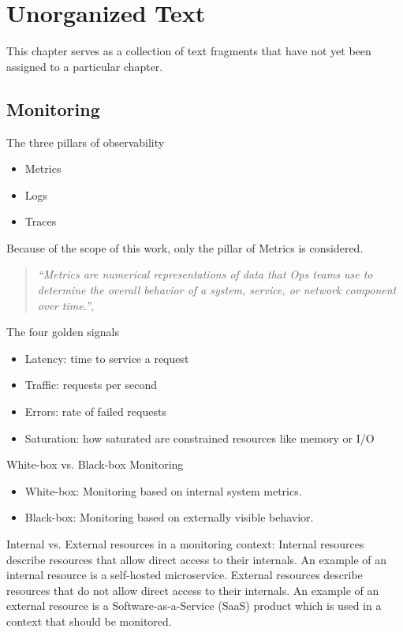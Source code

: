 \chapter{Unorganized Text}


This chapter serves as a collection of text fragments that have not yet been assigned to a particular chapter.

\section{Monitoring}

The three pillars of observability \cite{9837035}
\begin{itemize}
    \item Metrics
    \item Logs
    \item Traces
\end{itemize}

Because of the scope of this work, only the pillar of Metrics is considered.

\begin{quote}
\textit{``Metrics are numerical representations of data that Ops teams use to determine the overall behavior of a system, service, or network component over time.'', \cite{9837035}}
\end{quote}

The four golden signals \cite{Beyer2016-xi}
\begin{itemize}
    \item Latency: time to service a request
    \item Traffic: requests per second
    \item Errors: rate of failed requests
    \item Saturation: how saturated are constrained resources like memory or I/O
\end{itemize}

White-box vs. Black-box Monitoring \cite{Beyer2016-xi}
\begin{itemize}
    \item White-box: Monitoring based on internal system metrics.
    \item Black-box: Monitoring based on externally visible behavior.
\end{itemize}

Internal vs. External resources in a monitoring context:
Internal resources describe resources that allow direct access to their internals.
An example of an internal resource is a self-hosted microservice.
External resources describe resources that do not allow direct access to their internals.
An example of an external resource is a Software-as-a-Service (SaaS) product which is used in a context that should be monitored.

